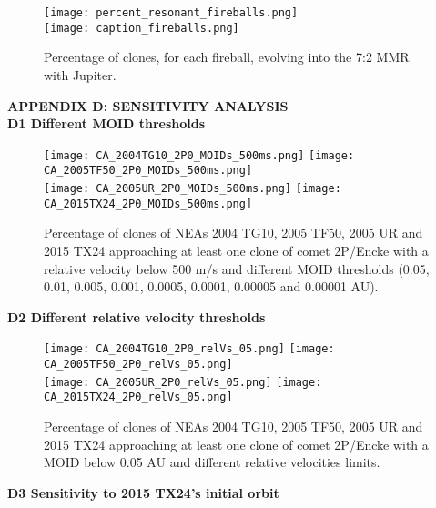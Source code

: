 \documentclass[a4paper,11pt]{article}
\begin{document}
\begin{figure}[!ht]
	\centering
	\texttt{[image: percent\_resonant\_fireballs.png]}\\[0.2cm]
	\texttt{[image: caption\_fireballs.png]}
	\caption{Percentage of clones, for each fireball, evolving into the 7:2 MMR with Jupiter.}
	\label{fig:percent_fireballs}
\end{figure}



\onecolumn
\textbf{APPENDIX D: SENSITIVITY ANALYSIS} \label{appendix:sensitivity} \\

\textbf{D1  Different MOID thresholds}\\

\begin{figure*}[!ht]
  \centering
  \texttt{[image: CA\_2004TG10\_2P0\_MOIDs\_500ms.png]}
  \texttt{[image: CA\_2005TF50\_2P0\_MOIDs\_500ms.png]}\\
  \texttt{[image: CA\_2005UR\_2P0\_MOIDs\_500ms.png]}
  \texttt{[image: CA\_2015TX24\_2P0\_MOIDs\_500ms.png]}
  \caption{Percentage of clones of NEAs 2004 TG10, 2005 TF50, 2005 UR and 2015 TX24 approaching at least one clone of comet 2P/Encke with a relative velocity below 500 m/s and different MOID thresholds (0.05, 0.01, 0.005, 0.001, 0.0005, 0.0001, 0.00005 and 0.00001 AU). }
  \label{fig:different_MOIDs}
\end{figure*}

\newpage
\textbf{D2  Different relative velocity thresholds}\\

\begin{figure*}[!ht]
  \centering
  \texttt{[image: CA\_2004TG10\_2P0\_relVs\_05.png]}
  \texttt{[image: CA\_2005TF50\_2P0\_relVs\_05.png]}\\
  \texttt{[image: CA\_2005UR\_2P0\_relVs\_05.png]}
  \texttt{[image: CA\_2015TX24\_2P0\_relVs\_05.png]}
  \caption{Percentage of clones of NEAs 2004 TG10, 2005 TF50, 2005 UR and 2015 TX24 approaching at least one clone of comet 2P/Encke with a MOID below 0.05 AU and different relative velocities limits.}
  \label{fig:different_relVs}
\end{figure*}

\newpage
\textbf{D3  Sensitivity to 2015 TX24's initial orbit}\\
\end{document}

